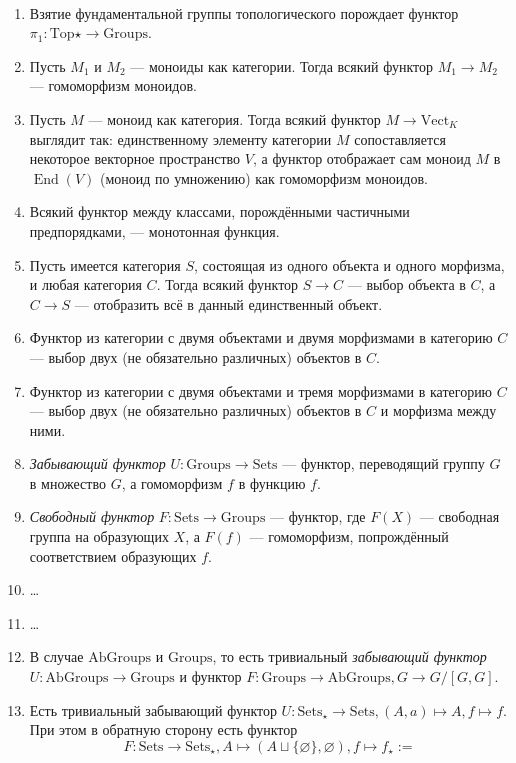 \documentclass[12pt,a4paper]{article}
\DeclareMathOperator{\End}{End}
\newcommand{\Sets}{\mathrm{Sets}}
\newcommand{\Groups}{\mathrm{Groups}}
\newcommand{\Vect}{\mathrm{Vect}}
\newcommand{\Top}{\mathrm{Top}}
\newcommand{\AbGroups}{\mathrm{AbGroups}}
\newcommand{\Setsstar}{\mathrm{Sets_\star}}
\begin{document}
    \begin{example}\ 
        \begin{enumerate}
            \item Взятие фундаментальной группы топологического порождает функтор $\pi_1: \Top\star \to \Groups$.
            \item Пусть $M_1$ и $M_2$ --- моноиды как категории. Тогда всякий функтор $M_1 \to M_2$ --- гомоморфизм моноидов.
            \item Пусть $M$ --- моноид как категория. Тогда всякий функтор $M \to \Vect_K$ выглядит так: единственному элементу категории $M$ сопоставляется некоторое векторное пространство $V$, а функтор отображает сам моноид $M$ в $\End(V)$ (моноид по умножению) как гомоморфизм моноидов.
            \item Всякий функтор между классами, порождёнными частичными предпорядками, --- монотонная функция.
            \item Пусть имеется категория $S$, состоящая из одного объекта и одного морфизма, и любая категория $C$. Тогда всякий функтор $S \to C$ --- выбор объекта в $C$, а $C \to S$ --- отобразить всё в данный единственный объект.
            \item Функтор из категории с двумя объектами и двумя морфизмами в категорию $C$ --- выбор двух (не обязательно различных) объектов в $C$.
            \item Функтор из категории с двумя объектами и тремя морфизмами в категорию $C$ --- выбор двух (не обязательно различных) объектов в $C$ и морфизма между ними.
            \item \emph{Забывающий функтор} $U: \Groups \to \Sets$ --- функтор, переводящий группу $G$ в множество $G$, а гомоморфизм $f$ в функцию $f$.
            \item \emph{Свободный функтор} $F: \Sets \to \Groups$ --- функтор, где $F(X)$ --- свободная группа на образующих $X$, а $F(f)$ --- гомоморфизм, попрождённый соответствием образующих $f$.
            \item \dots
            \item \dots
            \item В случае $\AbGroups$ и $\Groups$, то есть тривиальный \emph{забывающий функтор} $U: \AbGroups \to \Groups$ и функтор $F: \Groups \to \AbGroups, G \to G/[G, G]$.
            \item Есть тривиальный забывающий функтор $U: \Setsstar \to \Sets, (A, a) \mapsto A, f \mapsto f$. При этом в обратную сторону есть функтор
                \[
                    F: \Sets \to \Setsstar, A \mapsto (A \sqcup \{\varnothing\}, \varnothing), f \mapsto f_\star :=
\]
\end{enumerate}
\end{example}
\end{document}
